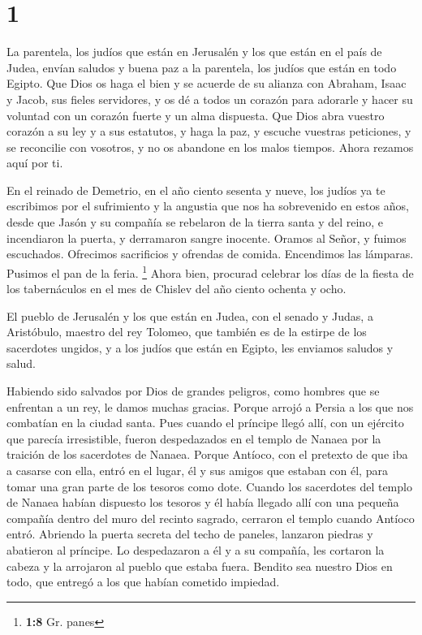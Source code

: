 \hypertarget{section}{%
\section{1}\label{section}}

 La parentela, los judíos que están en Jerusalén y los que
están en el país de Judea, envían saludos y buena paz a la parentela,
los judíos que están en todo Egipto.  Que Dios os haga el
bien y se acuerde de su alianza con Abraham, Isaac y Jacob, sus fieles
servidores,  y os dé a todos un corazón para adorarle y
hacer su voluntad con un corazón fuerte y un alma dispuesta.
 Que Dios abra vuestro corazón a su ley y a sus estatutos,
y haga la paz,  y escuche vuestras peticiones, y se
reconcilie con vosotros, y no os abandone en los malos tiempos.
 Ahora rezamos aquí por ti.

 En el reinado de Demetrio, en el año ciento sesenta y
nueve, los judíos ya te escribimos por el sufrimiento y la angustia que
nos ha sobrevenido en estos años, desde que Jasón y su compañía se
rebelaron de la tierra santa y del reino,  e incendiaron
la puerta, y derramaron sangre inocente. Oramos al Señor, y fuimos
escuchados. Ofrecimos sacrificios y ofrendas de comida. Encendimos las
lámparas. Pusimos el pan de la feria. \footnote{\textbf{1:8} Gr. panes}
 Ahora bien, procurad celebrar los días de la fiesta de
los tabernáculos en el mes de Chislev del año ciento ochenta y ocho.

 El pueblo de Jerusalén y los que están en Judea, con el
senado y Judas, a Aristóbulo, maestro del rey Tolomeo, que también es de
la estirpe de los sacerdotes ungidos, y a los judíos que están en
Egipto, les enviamos saludos y salud.

 Habiendo sido salvados por Dios de grandes peligros,
como hombres que se enfrentan a un rey, le damos muchas gracias.
 Porque arrojó a Persia a los que nos combatían en la
ciudad santa.  Pues cuando el príncipe llegó allí, con un
ejército que parecía irresistible, fueron despedazados en el templo de
Nanaea por la traición de los sacerdotes de Nanaea. 
Porque Antíoco, con el pretexto de que iba a casarse con ella, entró en
el lugar, él y sus amigos que estaban con él, para tomar una gran parte
de los tesoros como dote.  Cuando los sacerdotes del
templo de Nanaea habían dispuesto los tesoros y él había llegado allí
con una pequeña compañía dentro del muro del recinto sagrado, cerraron
el templo cuando Antíoco entró.  Abriendo la puerta
secreta del techo de paneles, lanzaron piedras y abatieron al príncipe.
Lo despedazaron a él y a su compañía, les cortaron la cabeza y la
arrojaron al pueblo que estaba fuera.  Bendito sea
nuestro Dios en todo, que entregó a los que habían cometido impiedad.

